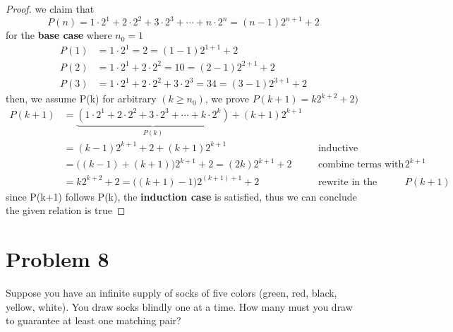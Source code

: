 \medskip
\solution

 \begin{proof}

      we claim that
      \[
      P(n) = 1\cdot 2^{1} + 2\cdot 2^{2} + 3\cdot 2^{3} + \cdots +
  n\cdot 2^{n} = (n-1)2^{n+1} + 2
      \]
      for the \textbf{base case} where $n_0 = 1$
      \[
      \begin{aligned}
      P(1) &= 1\cdot 2^{1} = 2 = (1-1)2^{1+1} + 2 \\
      P(2) &= 1\cdot 2^{1} + 2\cdot 2^{2} = 10 = (2-1)2^{2+1} + 2 \\
      P(3) &= 1\cdot 2^{1} + 2\cdot 2^{2} + 3\cdot 2^{3} = 34 = (3-1)2^{3+1} + 2
      \end{aligned}
      \]
      then, we assume P(k) for arbitrary $(k \ge n_0)$, we prove
  $P(k+1) = k2^{k+2} + 2)$
  \begin{align*}
  P(k+1) &= \underbrace{(1\cdot 2^{1} + 2\cdot 2^{2} + 3\cdot 2^{3} +
  \cdots + k\cdot 2^{k})}_{P(k)} + (k+1)2^{k+1}\\
  &= (k-1)2^{k+1} + 2 + (k+1)2^{k+1} && \text{inductive hypothesis}\\
      &= \bigl((k-1)+(k+1)\bigr)2^{k+1} + 2 = (2k)2^{k+1} + 2 && \text{combine terms with } 2^{k+1}\\
  &= k2^{k+2} + 2 = \bigl((k+1)-1\bigr)2^{(k+1)+1} + 2 && \text{rewrite in the expected form for } P(k+1)
  \end{align*}
  since P(k+1) follows P(k), the \textbf{induction case} is satisfied,
  thus we can conclude the given relation is true
 \end{proof}

\vspace{1em}
\hrulefill

\section*{Problem 8}
Suppose you have an infinite supply of socks of five colors (green, red, black, yellow, white). You draw socks blindly one at a time. How many must you draw to guarantee at least one matching pair?

\medskip
\solution

